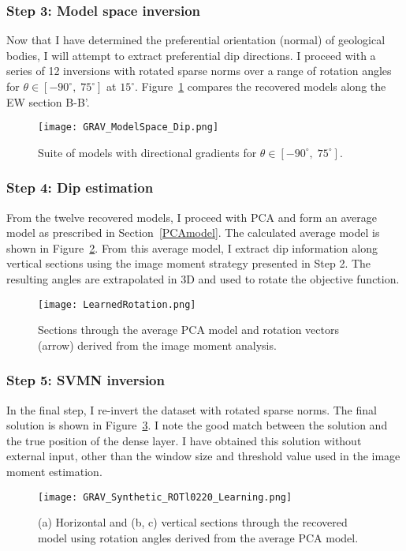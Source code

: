 \subsubsection{Step 3: Model space inversion}
Now that I have determined the preferential orientation (normal) of geological bodies, I will attempt to extract preferential dip directions. I proceed with a series of 12 inversions with rotated sparse norms over a range of rotation angles for $\theta \in [-90^\circ,\;75^\circ]$ at $15^\circ$. Figure~\ref{ModelSpace_Dip} compares the recovered models along the EW section B-B'.
\begin{figure}
\texttt{[image: GRAV\_ModelSpace\_Dip.png]}
\caption{Suite of models with directional gradients for $\theta \in [-90^\circ,\;75^\circ]$.}
\label{ModelSpace_Dip}
\end{figure}

\subsubsection{Step 4: Dip estimation}
From the twelve recovered models, I proceed with PCA and form an average model as prescribed in Section~\ref{PCAmodel}. The calculated average model is shown in Figure~\ref{LearnRotation}.
From this average model, I extract dip information along vertical sections using the image moment strategy presented in Step 2. The resulting angles are extrapolated in 3D and used to rotate the objective function.
\begin{figure}
\texttt{[image: LearnedRotation.png]}
\caption{Sections through the average PCA model and rotation vectors (arrow) derived from the image moment analysis.}
\label{LearnRotation}
\end{figure}

\subsubsection{Step 5: SVMN inversion}
In the final step, I re-invert the dataset with rotated sparse norms. The final solution is shown in Figure~\ref{GRAV_SVMN_rotation}. I note the good match between the solution and the true position of the dense layer. I have obtained this solution without external input, other than the window size and threshold value used in the image moment estimation.
\begin{figure}
\texttt{[image: GRAV\_Synthetic\_ROTl0220\_Learning.png]}
\caption{(a) Horizontal and (b, c) vertical sections through the recovered model using rotation angles derived from the average PCA model.}
\label{GRAV_SVMN_rotation}
\end{figure}

